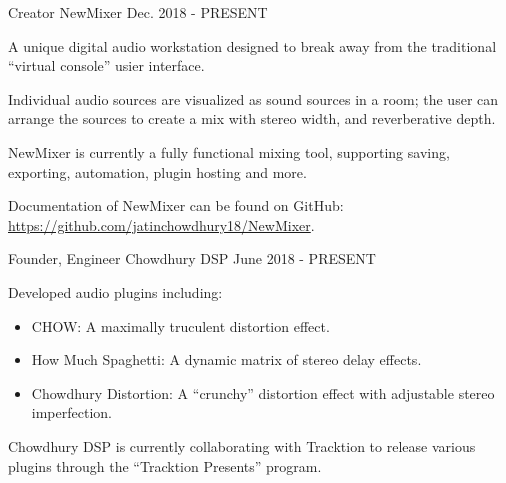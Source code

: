 

\begin{cventries}

  \cventry
    {Creator} %
    {NewMixer} %
    {} %
    {Dec. 2018 - PRESENT} %
    {
      \begin{cvitems} %
        \item {A unique digital audio workstation designed to break away from the traditional ``virtual console'' usier interface.}
        \item {Individual audio sources are visualized as sound sources in a room; the user can arrange the sources to create a mix with stereo width, and reverberative depth.}
        \item {NewMixer is currently a fully functional mixing tool, supporting saving, exporting, automation, plugin hosting and more.}
        \item {Documentation of NewMixer can be found on GitHub: \url{https://github.com/jatinchowdhury18/NewMixer}.}
      \end{cvitems}
    }

    \cventry
    {Founder, Engineer} %
    {Chowdhury DSP} %
    {} %
    {June 2018 - PRESENT} %
    {
      \begin{cvitems} %
        \item {Developed audio plugins including:}
        \begin{itemize}
            \item {CHOW: A maximally truculent distortion effect.}
            \item {How Much Spaghetti: A dynamic matrix of stereo delay effects.}
            \item {Chowdhury Distortion: A ``crunchy'' distortion effect with adjustable stereo imperfection.}
        \end{itemize}
        \item {Chowdhury DSP is currently collaborating with Tracktion to release various plugins through the ``Tracktion Presents'' program.}
      \end{cvitems}
    }


\end{cventries}
